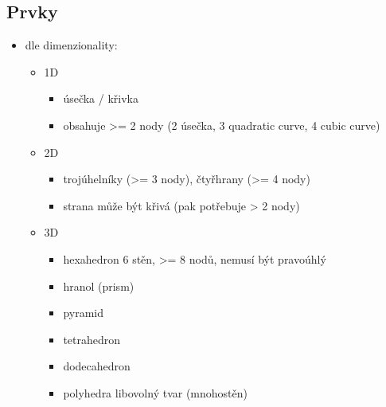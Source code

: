 \documentclass[letterpaper,10pt,czech]{sphinxmanual}
\begin{document}
\subsection{Prvky}
\label{\detokenize{prednaska_23092022:prvky}}\begin{itemize}
\item {} 
\sphinxAtStartPar
dle dimenzionality:
\begin{itemize}
\item {} 
\sphinxAtStartPar
1D
\begin{itemize}
\item {} 
\sphinxAtStartPar
úsečka / křivka

\item {} 
\sphinxAtStartPar
obsahuje \textgreater{}= 2 nody (2 \sphinxhyphen{} úsečka, 3 \sphinxhyphen{} quadratic curve, 4 \sphinxhyphen{} cubic curve)

\end{itemize}

\item {} 
\sphinxAtStartPar
2D
\begin{itemize}
\item {} 
\sphinxAtStartPar
trojúhelníky (\textgreater{}= 3 nody), čtyřhrany (\textgreater{}= 4 nody)

\item {} 
\sphinxAtStartPar
strana může být křivá (pak potřebuje \textgreater{} 2 nody)

\end{itemize}

\item {} 
\sphinxAtStartPar
3D
\begin{itemize}
\item {} 
\sphinxAtStartPar
hexahedron \sphinxhyphen{} 6 stěn, \textgreater{}= 8 nodů, nemusí být pravoúhlý

\item {} 
\sphinxAtStartPar
hranol (prism)

\item {} 
\sphinxAtStartPar
pyramid

\item {} 
\sphinxAtStartPar
tetrahedron

\item {} 
\sphinxAtStartPar
dodecahedron

\item {} 
\sphinxAtStartPar
polyhedra \sphinxhyphen{} libovolný tvar (mnohostěn)

\end{itemize}

\end{itemize}

\end{itemize}
\end{document}
